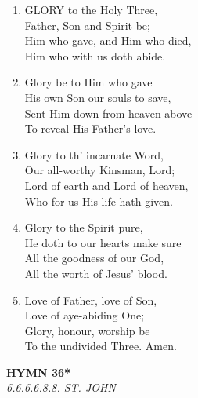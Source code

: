 \documentclass[11pt,a4paper]{article}
\begin{document}
\begin{enumerate}
    \item GLORY to the Holy Three, \\
        Father, Son and Spirit be; \\
        Him who gave, and Him who died, \\
        Him who with us doth abide.

    \item Glory be to Him who gave \\
        His own Son our souls to save, \\
        Sent Him down from heaven above \\
        To reveal His Father's love.

    \item Glory to th' incarnate Word, \\
        Our all-worthy Kinsman, Lord; \\
        Lord of earth and Lord of heaven, \\
        Who for us His life hath given.

    \item Glory to the Spirit pure, \\
        He doth to our hearts make sure \\
        All the goodness of our God, \\
        All the worth of Jesus' blood.

    \item Love of Father, love of Son, \\
        Love of aye-abiding One; \\
        Glory, honour, worship be \\
        To the undivided Three. Amen.

\end{enumerate}

\newpage
\begin{center}
    {\Large \textbf{HYMN 36*}}
    \\
    \textit{6.6.6.6.8.8. ST. JOHN}
\end{center}
\vspace{1em}
\end{document}
